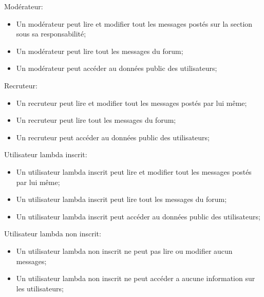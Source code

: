 \documentclass{report}
\begin{document}
Modérateur:
\begin{itemize}
	\item Un modérateur peut lire et modifier tout les messages postés sur la section sous sa responsabilité;
  \item Un modérateur peut lire tout les messages du forum;
	\item Un modérateur peut accéder au données public des utilisateurs;\\
\end{itemize}


Recruteur:
\begin{itemize}
  \item Un recruteur peut lire et modifier tout les messages postés par lui même;
  \item Un recruteur peut lire tout les messages du forum;
  \item Un recruteur peut accéder au données public des utilisateurs;\\
\end{itemize}



Utilisateur lambda inscrit:
\begin{itemize}
  \item Un utilisateur lambda inscrit peut lire et modifier tout les messages postés par lui même;
  \item Un utilisateur lambda inscrit peut lire tout les messages du forum;
  \item Un utilisateur lambda inscrit peut accéder au données public des utilisateurs;\\
\end{itemize}


Utilisateur lambda non inscrit:
\begin{itemize}
  \item Un utilisateur lambda non inscrit ne peut pas lire ou modifier aucun messages;
  \item Un utilisateur lambda non inscrit ne peut accéder a aucune information sur les utilisateurs;\\
\end{itemize}
\end{document}
